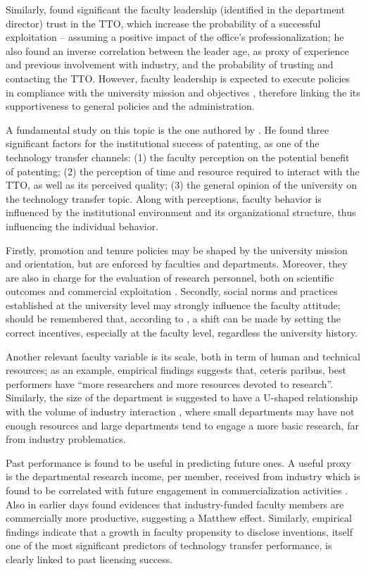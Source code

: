 Similarly, \citet{Muscio2010} found significant the faculty leadership (identified in the department director) trust in the TTO, which increase the probability of a successful exploitation – assuming a positive impact of the office's professionalization; he also found an inverse correlation between the leader age, as proxy of experience and previous involvement with industry, and the probability of trusting and contacting the TTO. However, faculty leadership is expected to execute policies in compliance with the university mission and objectives \citep{Chang2016}, therefore linking the its supportiveness to general policies and the administration. 

A fundamental study on this topic is the one authored by \citet{OwenSmith2001}. He found three significant factors for the institutional success of patenting, as one of the technology transfer channels: (1) the faculty perception on the potential benefit of patenting; (2) the perception of time and resource required to interact with the TTO, as well as its perceived quality; (3) the general opinion of the university on the technology transfer topic. Along with perceptions, faculty behavior is influenced by the institutional environment and its organizational structure, thus influencing the individual behavior. 

Firstly, promotion and tenure policies may be shaped by the university mission and orientation, but are enforced by faculties and departments. Moreover, they are also in charge for the evaluation of research personnel, both on scientific outcomes and commercial exploitation \citep{Chang2016}. Secondly, social norms and practices established at the university level may strongly influence the faculty attitude; should be remembered that, according to \citet{Bercovitz2006}, a shift can be made by setting the correct incentives, especially at the faculty level, regardless the university history.

Another relevant faculty variable is its scale, both in term of human and technical resources; as an example, \citet{OwenSmith2001} empirical findings suggests that, ceteris paribus, best performers have \enquote{more researchers and more resources devoted to research}. Similarly, the size of the department is suggested to have a U-shaped relationship with the volume of industry interaction \citep{DEste2007}, where small departments may have not enough resources and large departments tend to engage a more basic research, far from industry problematics.

Past performance is found to be useful in predicting future ones. A useful proxy is the departmental research income, per member, received from industry which is found to be correlated with future engagement in commercialization activities \citep{DEste2007}. Also \citet{Blumenthal1996} in earlier days found evidences that industry-funded faculty members are commercially more productive, suggesting a Matthew effect. Similarly, \citet{Thursby2002} empirical findings indicate that a growth in faculty propensity to disclose inventions, itself one of the most significant predictors of technology transfer performance, is clearly linked to past licensing success. 

